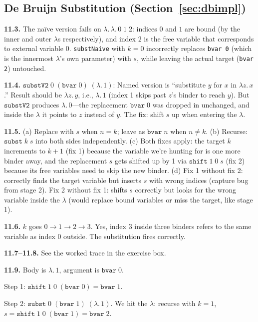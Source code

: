 \documentclass[11pt,a4paper]{article}
\newcounter{exercise}[section]
\theoremstyle{definition}
\newcommand{\lam}{\lambda}
\begin{document}
\subsection*{De Bruijn Substitution (Section~\ref{sec:dbimpl})}

\textbf{11.3.}\; The na\"ive version fails on $\lam.\,\lam.\, 0\;1\;2$:
indices $0$ and $1$ are bound (by the inner and outer $\lam$s respectively),
and index $2$ is the free variable that corresponds to external variable $0$.
\texttt{substNaive} with $k=0$ incorrectly replaces \texttt{bvar 0} (which is
the innermost $\lam$'s own parameter) with $s$, while leaving the actual target
(\texttt{bvar 2}) untouched.

\medskip
\textbf{11.4.}\; $\texttt{substV2}\;0\;(\texttt{bvar}\;0)\;(\lam.\, 1)$:
Named version is ``substitute $y$ for $x$ in $\lam z.\, x$.'' Result should
be $\lam z.\, y$, i.e., $\lam.\, 1$ (index 1 skips past $z$'s binder to
reach $y$). But $\texttt{substV2}$ produces $\lam.\, 0$---the replacement
$\texttt{bvar}\;0$ was dropped in unchanged, and inside the $\lam$ it points
to $z$ instead of $y$. The fix: shift $s$ up when entering the $\lam$.

\medskip
\textbf{11.5.}\; (a) Replace with $s$ when $n = k$; leave as $\texttt{bvar}\;n$
when $n \neq k$.
(b) Recurse: $\texttt{subst}\;k\;s$ into both sides independently.
(c) Both fixes apply: the target $k$ increments to $k + 1$ (fix 1) because the
variable we're hunting for is one more binder away, and the replacement $s$
gets shifted up by 1 via $\texttt{shift}\;1\;0\;s$ (fix 2) because its free
variables need to skip the new binder.
(d) Fix 1 without fix 2: correctly finds the target variable but inserts $s$
with wrong indices (capture bug from stage 2). Fix 2 without fix 1: shifts $s$
correctly but looks for the wrong variable inside the $\lam$ (would replace
bound variables or miss the target, like stage 1).

\medskip
\textbf{11.6.}\; $k$ goes $0 \to 1 \to 2 \to 3$. Yes, index $3$ inside three binders refers to the same variable as index $0$ outside. The substitution fires correctly.

\medskip
\textbf{11.7--11.8.}\; See the worked trace in the exercise box.

\medskip
\textbf{11.9.}\; Body is $\lam.\, 1$, argument is $\texttt{bvar}\;0$.

Step 1: $\texttt{shift}\;1\;0\;(\texttt{bvar}\;0) = \texttt{bvar}\;1$.

Step 2: $\texttt{subst}\;0\;(\texttt{bvar}\;1)\;(\lam.\, 1)$. We hit the $\lam$: recurse with $k = 1$, $s = \texttt{shift}\;1\;0\;(\texttt{bvar}\;1) = \texttt{bvar}\;2$.
\end{document}
